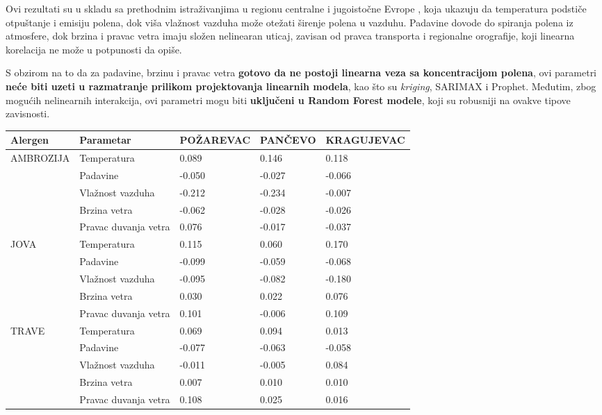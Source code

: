 \documentclass[12pt]{article}
\begin{document}
Ovi rezultati su u skladu sa prethodnim istraživanjima u regionu centralne i jugoistočne Evrope \cite{sofiev2006towards,grewling2016combining,sikoparija2017pannonian}, 
koja ukazuju da temperatura podstiče otpuštanje i emisiju polena, dok viša vlažnost vazduha može otežati širenje polena u vazduhu. Padavine dovode do spiranja polena iz atmosfere, dok brzina i pravac vetra imaju složen nelinearan uticaj, zavisan od pravca transporta i regionalne orografije, koji linearna korelacija ne može u potpunosti da opiše.

S obzirom na to da za padavine, brzinu i pravac vetra \textbf{gotovo da ne postoji linearna veza sa koncentracijom polena}, ovi parametri \textbf{neće biti uzeti u razmatranje prilikom projektovanja linearnih modela}, kao što su \textit{kriging}, SARIMAX i Prophet. Međutim, zbog mogućih nelinearnih interakcija, ovi parametri mogu biti \textbf{uključeni u Random Forest modele}, koji su robusniji na ovakve tipove zavisnosti.

\begin{table}[!ht]
    \centering
    \begin{tabular}{|l|l|l|l|l|}
    \hline
        Alergen & Parametar & POŽAREVAC & PANČEVO & KRAGUJEVAC \\ \hline
        \multirow{5}{*}{AMBROZIJA}
        & Temperatura & 0.089 & 0.146 & 0.118 \\ \cline{2-5}
        & Padavine & -0.050 & -0.027 & -0.066 \\ \cline{2-5}
        & Vlažnost vazduha & -0.212 & -0.234 & -0.007 \\ \cline{2-5}
        & Brzina vetra & -0.062 & -0.028 & -0.026 \\ \cline{2-5}
        & Pravac duvanja vetra & 0.076 & -0.017 & -0.037 \\ \hline
        \multirow{5}{*}{JOVA}
        & Temperatura & 0.115 & 0.060 & 0.170 \\ \cline{2-5}
        & Padavine & -0.099 & -0.059 & -0.068 \\ \cline{2-5}
        & Vlažnost vazduha & -0.095 & -0.082 & -0.180 \\ \cline{2-5}
        & Brzina vetra & 0.030 & 0.022 & 0.076 \\ \cline{2-5}
        & Pravac duvanja vetra & 0.101 & -0.006 & 0.109 \\ \hline
        \multirow{5}{*}{TRAVE}
        & Temperatura & 0.069 & 0.094 & 0.013 \\ \cline{2-5}
        & Padavine & -0.077 & -0.063 & -0.058 \\ \cline{2-5}
        & Vlažnost vazduha & -0.011 & -0.005 & 0.084 \\ \cline{2-5}
        & Brzina vetra & 0.007 & 0.010 & 0.010 \\ \cline{2-5}
        & Pravac duvanja vetra & 0.108 & 0.025 & 0.016 \\ \hline
    \end{tabular}
\end{table}
\end{document}
